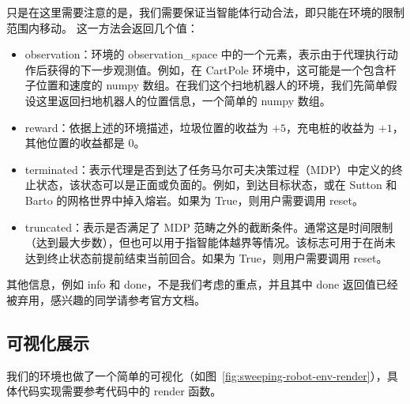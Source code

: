只是在这里需要注意的是，我们需要保证当智能体行动合法，即只能在环境的限制范围内移动。
这一方法会返回几个值：
\begin{itemize}
    \item observation：环境的 observation\_space 中的一个元素，表示由于代理执行动作后获得的下一步观测值。例如，在 CartPole 环境中，这可能是一个包含杆子位置和速度的 numpy 数组。在我们这个扫地机器人的环境，我们先简单假设这里返回扫地机器人的位置信息，一个简单的 numpy 数组。
    \item reward：依据上述的环境描述，垃圾位置的收益为 \(+5\)，充电桩的收益为 \(+1\)，其他位置的收益都是 \(0\)。
    \item terminated：表示代理是否到达了任务马尔可夫决策过程（MDP）中定义的终止状态，该状态可以是正面或负面的。例如，到达目标状态，或在 Sutton 和 Barto 的网格世界中掉入熔岩。如果为 True，则用户需要调用 \textsf{reset}。
    \item truncated：表示是否满足了 MDP 范畴之外的截断条件。通常这是时间限制（达到最大步数），但也可以用于指智能体越界等情况。该标志可用于在尚未达到终止状态前提前结束当前回合。如果为 True，则用户需要调用 \textsf{reset}。
\end{itemize}
其他信息，例如 info 和 done，不是我们考虑的重点，并且其中 done 返回值已经被弃用，感兴趣的同学请参考官方文档。

\subsection{可视化展示}

我们的环境也做了一个简单的可视化（如图~\ref{fig:sweeping-robot-env-render}），具体代码实现需要参考代码中的 \textsf{render} 函数。


